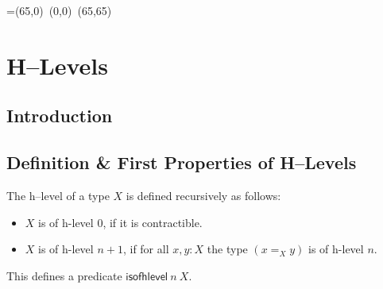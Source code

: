 


\newbox\pbbox
\setbox\pbbox=\hbox{\xy \POS(65,0)\ar@{-} (0,0) \ar@{-} (65,65)\endxy}
\def\pb{\save[]+<3.5mm,-3.5mm>*{\copy\pbbox} \restore}


\newcommand{\comp}[2]{\ensuremath{{#2} \circ {#1}}}

% 
\newcommand{\contr}{\ensuremath{\mathsf{contr}}}
\newcommand{\iscontr}{\ensuremath{\mathsf{iscontr}}}
 \newcommand{\HLevel}{\mathsf{HLevel}}
 \newcommand{\hProp}{\mathsf{hProp}}
 \newcommand{\ishProp}{\mathsf{ishProp}}
 \newcommand{\isofhlevel}{\mathsf{isofhlevel}}
 \newcommand{\isweq}{\mathsf{isweq}}
 \newcommand{\Nat}{\mathsf{Nat}}
 \newcommand{\Type}{\mathsf{Type}}






\chapter{H--Levels}

\section{Introduction}


\section{Definition \& First Properties of H--Levels}

\begin{defn}
 The h--level of a type $X$ is defined recursively as follows:
 \begin{itemize}
  \item $X$ is of h-level $0$, if it is contractible.
  \item $X$ is of h-level $n+1$, if for all $x, y : X$ the type $(x =_X y)$ is of h-level $n$.
 \end{itemize}
 This defines a predicate $\isofhlevel \ n \ X$.
\end{defn}

